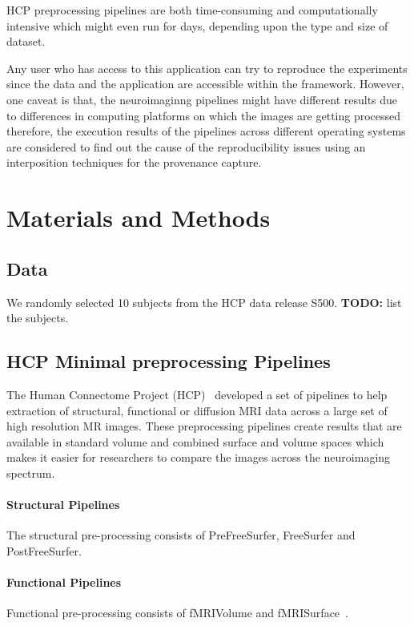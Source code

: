 \documentclass{article}
\newcommand{\todo}[1]{\color{red}\textbf{TODO:}#1\color{black}}
\begin{document}
HCP preprocessing pipelines are both time-consuming and
computationally intensive which might even run for days, depending
upon the type and size of dataset.

Any
user who has access to this application can try to reproduce the
experiments since the data and the application are accessible within
the framework. However, one caveat is that, the neuroimaginng
pipelines might have different results due to differences in computing
platforms on which the images are getting processed
~\cite{10.3389/conf.fninf.2014.18.00076} therefore, the execution
results of the pipelines across different operating systems are
considered to find out the cause of the reproducibility issues using
an interposition techniques for the provenance capture.


\section{Materials and Methods}

\subsection{Data}

We randomly selected 10 subjects from the HCP data release
S500. \todo{ list the subjects.}

\subsection{HCP Minimal preprocessing Pipelines}

The Human Connectome Project (HCP)~\cite{Gla13} developed a set of
pipelines to help extraction of structural, functional or diffusion
MRI data across a large set of high resolution MR images. These
preprocessing pipelines create results that are available in standard
volume and combined surface and volume spaces which makes it easier
for researchers to compare the images across the neuroimaging
spectrum.

\paragraph{Structural Pipelines} The structural pre-processing consists of PreFreeSurfer, FreeSurfer and PostFreeSurfer. 
\paragraph{Functional Pipelines} Functional pre-processing consists of fMRIVolume and fMRISurface~\cite{FSL}. 
\end{document}
